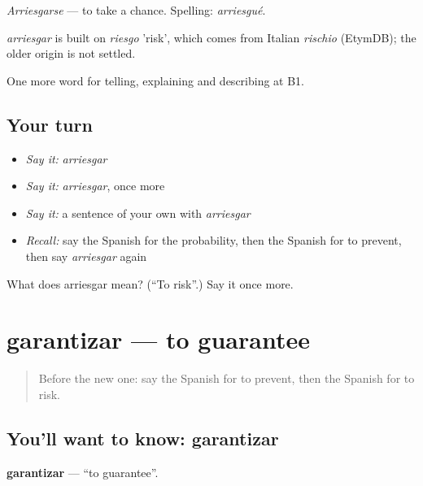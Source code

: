 \emph{Arriesgarse} — to take a chance. Spelling: \emph{arriesgué}.

\begin{cousinweb}
\emph{arriesgar} is built on \emph{riesgo} 'risk', which comes from Italian \emph{rischio} (EtymDB); the older origin is not settled.
\end{cousinweb}

\begin{grammarlens}[title={What you've built}]
One more word for telling, explaining and describing at B1.
\end{grammarlens}

\subsection*{Your turn}
\begin{itemize}
\raggedright
  \item \emph{Say it:} \emph{arriesgar}
  \item \emph{Say it:} \emph{arriesgar}, once more
  \item \emph{Say it:} a sentence of your own with \emph{arriesgar}
  \item \emph{Recall:} say the Spanish for the probability, then the Spanish for to prevent, then say \emph{arriesgar} again
\end{itemize}

\begin{tcolorbox}[breakable,colback=teal!4,colframe=teal!35!black,title={Before you move on}]
What does arriesgar mean? (\textquotedblleft{}To risk\textquotedblright{}.) Say it once more.
\end{tcolorbox}
\section[garantizar]{garantizar — to guarantee}

\label{lesson:ES-C614-garantizar}



\begin{quote}
Before the new one: say the Spanish for to prevent, then the Spanish for to risk.
\end{quote}

\subsection*{You'll want to know: garantizar}
\textbf{garantizar} — \textquotedblleft{}to guarantee\textquotedblright{}.

